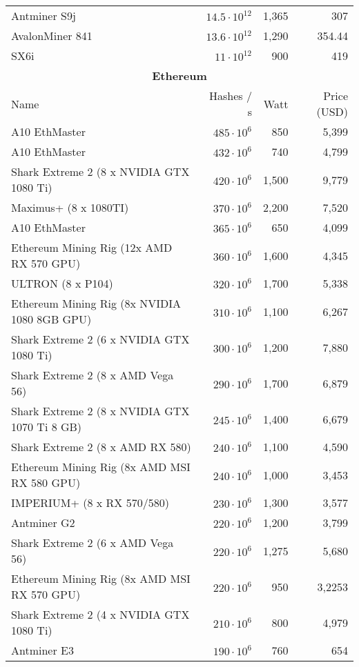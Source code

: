 \begin{longtable}{|p{}|r|r|r|}
  Antminer S9j & $14.5 \cdot 10^{12}$ & 1,365 & 307 \\
  AvalonMiner 841 & $13.6 \cdot 10^{12}$ & 1,290 & 354.44 \\
  SX6i & $11 \cdot 10^{12}$ & 900 & 419 \\
  \hline
  \multicolumn{4}{|c|}{\textbf{Ethereum}} \\
  \hline
  Name & Hashes / s & Watt & Price (USD) \\
  \hhline{|=|=|=|=|}
  A10 EthMaster & $485 \cdot 10^{6}$ & 850 & 5,399 \\
  A10 EthMaster & $432 \cdot 10^{6}$ & 740 & 4,799 \\
  Shark Extreme 2 (8 x NVIDIA GTX 1080 Ti) & $420 \cdot 10^{6}$ & 1,500 & 9,779 \\
  Maximus+ (8 x 1080TI) & $370 \cdot 10^{6}$ & 2,200 & 7,520 \\
  A10 EthMaster & $365 \cdot 10^{6}$ & 650 & 4,099 \\
  Ethereum Mining Rig (12x AMD RX 570 GPU) & $360 \cdot 10^{6}$ & 1,600 & 4,345 \\
  ULTRON (8 x P104) & $320 \cdot 10^{6}$ & 1,700 & 5,338 \\
  Ethereum Mining Rig (8x NVIDIA 1080 8GB GPU) & $310 \cdot 10^{6}$ & 1,100 & 6,267 \\
  Shark Extreme 2 (6 x NVIDIA GTX 1080 Ti) & $300 \cdot 10^{6}$ & 1,200 & 7,880 \\
  Shark Extreme 2 (8 x AMD Vega 56) & $290 \cdot 10^{6}$ & 1,700 & 6,879 \\
  Shark Extreme 2 (8 x NVIDIA GTX 1070 Ti 8 GB) & $245 \cdot 10^{6}$ & 1,400 & 6,679 \\
  Shark Extreme 2 (8 x AMD RX 580) & $240 \cdot 10^{6}$ & 1,100 & 4,590 \\
  Ethereum Mining Rig (8x AMD MSI RX 580 GPU) & $240 \cdot 10^{6}$ & 1,000 & 3,453 \\
  IMPERIUM+ (8 x RX 570/580) & $230 \cdot 10^{6}$ & 1,300 & 3,577 \\
  Antminer G2 & $220 \cdot 10^{6}$ & 1,200 & 3,799 \\
  Shark Extreme 2 (6 x AMD Vega 56) & $220 \cdot 10^{6}$ & 1,275 & 5,680 \\
  Ethereum Mining Rig (8x AMD MSI RX 570 GPU) & $220 \cdot 10^{6}$ & 950 & 3,2253 \\
  Shark Extreme 2 (4 x NVIDIA GTX 1080 Ti) & $210 \cdot 10^{6}$ & 800 & 4,979 \\
  Antminer E3 & $190 \cdot 10^{6}$ & 760 & 654 \\

\end{longtable}
